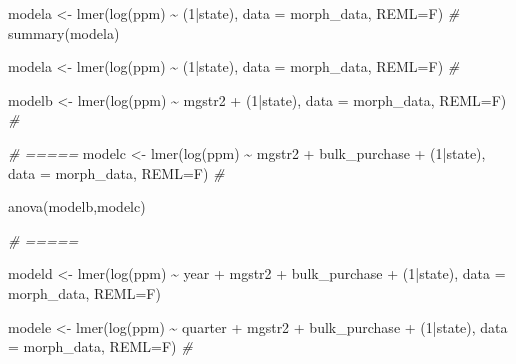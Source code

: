 \documentclass[
  11pt,
]{article}
\newenvironment{Shaded}{\begin{snugshade}}{\end{snugshade}}
\newcommand{\AttributeTok}[1]{\textcolor[rgb]{0.77,0.63,0.00}{#1}}
\newcommand{\CommentTok}[1]{\textcolor[rgb]{0.56,0.35,0.01}{\textit{#1}}}
\newcommand{\DecValTok}[1]{\textcolor[rgb]{0.00,0.00,0.81}{#1}}
\newcommand{\FunctionTok}[1]{\textcolor[rgb]{0.00,0.00,0.00}{#1}}
\newcommand{\NormalTok}[1]{#1}
\newcommand{\OtherTok}[1]{\textcolor[rgb]{0.56,0.35,0.01}{#1}}
\newcommand{\SpecialCharTok}[1]{\textcolor[rgb]{0.00,0.00,0.00}{#1}}
\begin{document}
\begin{Shaded}
\begin{Highlighting}[]
\NormalTok{modela }\OtherTok{\textless{}{-}} \FunctionTok{lmer}\NormalTok{(}\FunctionTok{log}\NormalTok{(ppm) }\SpecialCharTok{\textasciitilde{}}\NormalTok{  (}\DecValTok{1}\SpecialCharTok{|}\NormalTok{state), }\AttributeTok{data =}\NormalTok{ morph\_data, }\AttributeTok{REML=}\NormalTok{F) }\CommentTok{\#}
\FunctionTok{summary}\NormalTok{(modela)}
\end{Highlighting}
\end{Shaded}

\begin{Shaded}
\begin{Highlighting}[]
\NormalTok{modela }\OtherTok{\textless{}{-}} \FunctionTok{lmer}\NormalTok{(}\FunctionTok{log}\NormalTok{(ppm) }\SpecialCharTok{\textasciitilde{}}\NormalTok{  (}\DecValTok{1}\SpecialCharTok{|}\NormalTok{state), }\AttributeTok{data =}\NormalTok{ morph\_data, }\AttributeTok{REML=}\NormalTok{F) }\CommentTok{\#}


\NormalTok{modelb }\OtherTok{\textless{}{-}} \FunctionTok{lmer}\NormalTok{(}\FunctionTok{log}\NormalTok{(ppm) }\SpecialCharTok{\textasciitilde{}}\NormalTok{  mgstr2 }\SpecialCharTok{+}\NormalTok{ (}\DecValTok{1}\SpecialCharTok{|}\NormalTok{state), }\AttributeTok{data =}\NormalTok{ morph\_data, }\AttributeTok{REML=}\NormalTok{F) }\CommentTok{\#}




\CommentTok{\# =====}
\NormalTok{modelc }\OtherTok{\textless{}{-}} \FunctionTok{lmer}\NormalTok{(}\FunctionTok{log}\NormalTok{(ppm) }\SpecialCharTok{\textasciitilde{}}\NormalTok{  mgstr2 }\SpecialCharTok{+}\NormalTok{ bulk\_purchase }\SpecialCharTok{+}\NormalTok{ (}\DecValTok{1}\SpecialCharTok{|}\NormalTok{state), }\AttributeTok{data =}\NormalTok{ morph\_data, }\AttributeTok{REML=}\NormalTok{F) }\CommentTok{\#}

\FunctionTok{anova}\NormalTok{(modelb,modelc)}


\CommentTok{\# =====}

\NormalTok{modeld }\OtherTok{\textless{}{-}} \FunctionTok{lmer}\NormalTok{(}\FunctionTok{log}\NormalTok{(ppm) }\SpecialCharTok{\textasciitilde{}}\NormalTok{  year }\SpecialCharTok{+}\NormalTok{ mgstr2 }\SpecialCharTok{+}\NormalTok{ bulk\_purchase }\SpecialCharTok{+}\NormalTok{ (}\DecValTok{1}\SpecialCharTok{|}\NormalTok{state), }\AttributeTok{data =}\NormalTok{ morph\_data, }\AttributeTok{REML=}\NormalTok{F)}

\NormalTok{modele }\OtherTok{\textless{}{-}} \FunctionTok{lmer}\NormalTok{(}\FunctionTok{log}\NormalTok{(ppm) }\SpecialCharTok{\textasciitilde{}}\NormalTok{  quarter }\SpecialCharTok{+}\NormalTok{ mgstr2 }\SpecialCharTok{+}\NormalTok{ bulk\_purchase }\SpecialCharTok{+}\NormalTok{ (}\DecValTok{1}\SpecialCharTok{|}\NormalTok{state), }\AttributeTok{data =}\NormalTok{ morph\_data, }\AttributeTok{REML=}\NormalTok{F) }\CommentTok{\#}


\end{Highlighting}
\end{Shaded}
\end{document}
